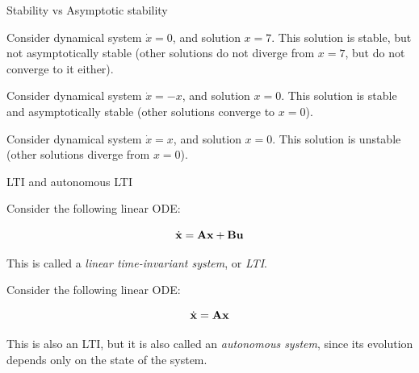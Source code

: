 \documentclass{beamer}
\begin{document}
\begin{frame}{Stability vs Asymptotic stability}
\begin{flushleft}

\begin{example}
Consider dynamical system $\dot{x} = 0$, and solution $x = 7$. This solution is stable, but not asymptotically stable (other solutions do not diverge from $x = 7$, but do not converge to it either).
\end{example}

\begin{example}
Consider dynamical system $\dot{x} = -x$, and solution $x = 0$. This solution is stable and asymptotically stable (other solutions converge to $x = 0$).
\end{example}

\begin{example}
Consider dynamical system $\dot{x} = x$, and solution $x = 0$. This solution is unstable (other solutions diverge from $x = 0$).
\end{example}

\end{flushleft}
\end{frame}



\begin{frame}{LTI and autonomous LTI}
\begin{flushleft}

Consider the following linear ODE:

\begin{equation}
    \dot{\mathbf{x}} = \mathbf{A} \mathbf{x} + \mathbf{B} \mathbf{u}
\end{equation}

This is called a \emph{linear time-invariant system}, or \emph{LTI}.

\bigskip

Consider the following linear ODE:

\begin{equation}
    \dot{\mathbf{x}} = \mathbf{A} \mathbf{x}
\end{equation}

This is also an LTI, but it is also called an \emph{autonomous system}, since its evolution depends only on the state of the system.

\end{flushleft}
\end{frame}
\end{document}
